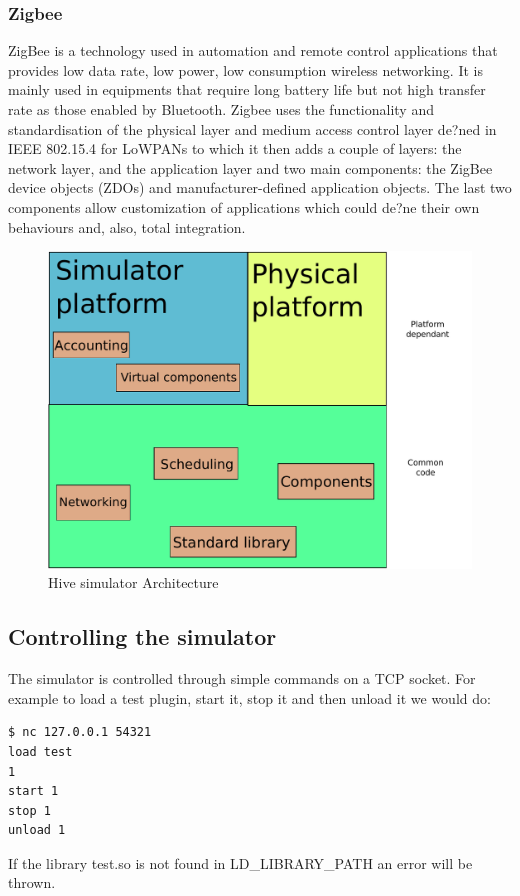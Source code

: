 \subsubsection{Zigbee}
ZigBee is a technology used in automation and remote control applications that
provides low data rate, low power, low consumption wireless networking. It is mainly
used in equipments that require long battery life but not high transfer rate as those
enabled by Bluetooth.
Zigbee uses the functionality and standardisation of the physical layer and
medium access control layer de?ned in IEEE 802.15.4 for LoWPANs to which it then adds
a couple of layers: the network layer, and the application layer and two main
components: the ZigBee device objects (ZDOs) and manufacturer-defined application objects.
The last two components allow customization of applications which could de?ne
their own behaviours and, also, total integration.

\begin{figure}[htb]
  \begin{center}
    \includegraphics[scale=0.75]{img/bigarch.pdf}
    \caption{Hive simulator Architecture}
  \end{center}
\end{figure}


\subsection{Controlling the simulator}

The simulator is controlled through simple commands on a TCP socket. For
example to load a test plugin, start it, stop it and then unload it we would
do:
\begin{lstlisting}
$ nc 127.0.0.1 54321
load test
1
start 1
stop 1
unload 1
\end{lstlisting}

If the library test.so is not found in LD_LIBRARY_PATH an error will be
thrown.
